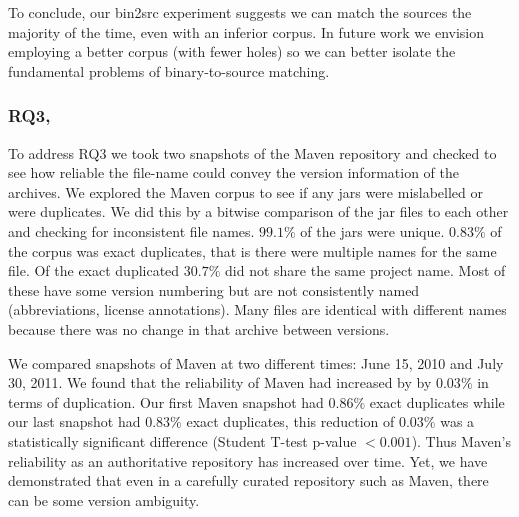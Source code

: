 To conclude, our bin2src experiment suggests we can match the sources the
majority of the time, even with an inferior corpus.  In future work we
envision employing a better corpus (with fewer holes) so we can better
isolate the fundamental problems of binary-to-source matching.







\subsubsection{RQ3, \rqThree}
\label{sec:mavenreliability}

To address RQ3 we took two snapshots of the Maven repository and checked to
see how reliable the file-name could convey the version information of the
archives.  We explored the Maven corpus to see if any jars were mislabelled
or were duplicates. We did this by a bitwise comparison of the jar files to
each other and checking for inconsistent file names. $99.1\%$ of the jars
were unique.  $0.83\%$ of the corpus was exact duplicates, that is there
were multiple names for the same file.  Of the exact duplicated $30.7\%$
did not share the same project name.  Most of these have some version
numbering but are not consistently named (abbreviations, license
annotations). Many files are identical with different names because there
was no change in that archive between versions. 

We compared snapshots of Maven at two different times: June 15, 2010 and
July 30, 2011. We found that the reliability of Maven had increased by by
$0.03\%$ in terms of duplication.  Our first Maven snapshot had $0.86\%$
exact duplicates while our last snapshot had $0.83\%$ exact duplicates,
this reduction of $0.03\%$ was a statistically significant difference
(Student T-test p-value $< 0.001$).  Thus Maven's reliability as an
authoritative repository has increased over time. Yet, we have demonstrated
that even in a carefully curated repository such as Maven, there can be
some version ambiguity.

